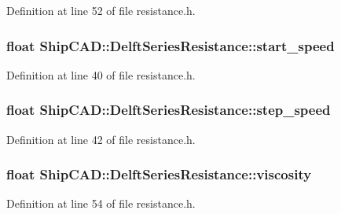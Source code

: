 Definition at line 52 of file resistance.\-h.

\hypertarget{structShipCAD_1_1DelftSeriesResistance_a040e0d678c7dbc24c29b7da618b4094d}{
\subsubsection[{start\-\_\-speed}]{\setlength{\rightskip}{0pt plus 5cm}float Ship\-C\-A\-D\-::\-Delft\-Series\-Resistance\-::start\-\_\-speed}}\label{structShipCAD_1_1DelftSeriesResistance_a040e0d678c7dbc24c29b7da618b4094d}


Definition at line 40 of file resistance.\-h.

\hypertarget{structShipCAD_1_1DelftSeriesResistance_a0e3ee6d984afd4ddf1cf483261904574}{
\subsubsection[{step\-\_\-speed}]{\setlength{\rightskip}{0pt plus 5cm}float Ship\-C\-A\-D\-::\-Delft\-Series\-Resistance\-::step\-\_\-speed}}\label{structShipCAD_1_1DelftSeriesResistance_a0e3ee6d984afd4ddf1cf483261904574}


Definition at line 42 of file resistance.\-h.

\hypertarget{structShipCAD_1_1DelftSeriesResistance_a08ff900d51b56d7e1726cb4b5a6ffa9b}{
\subsubsection[{viscosity}]{\setlength{\rightskip}{0pt plus 5cm}float Ship\-C\-A\-D\-::\-Delft\-Series\-Resistance\-::viscosity}}\label{structShipCAD_1_1DelftSeriesResistance_a08ff900d51b56d7e1726cb4b5a6ffa9b}


Definition at line 54 of file resistance.\-h.

